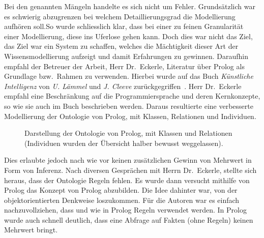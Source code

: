 Bei den genannten Mängeln handelte es sich nicht um Fehler. Grundsätzlich war es schwierig abzugrenzen bei welchem Detaillierungsgrad die Modellierung aufhören soll.So wurde schliesslich klar, dass bei einer zu feinen Granularität einer Modellierung, diese ins Uferlose gehen kann. Doch dies war nicht das Ziel, das Ziel war ein System zu schaffen, welches die Mächtigkeit dieser Art der Wissensmodellierung aufzeigt und damit Erfahrungen zu gewinnen. Daraufhin empfahl der Betreuer der Arbeit, Herr Dr.\ Eckerle, Literatur über Prolog als Grundlage bzw.\ Rahmen zu verwenden. Hierbei wurde auf das Buch \textit{Künstliche Intelligenz} von \textit{U. Lämmel} und \textit{J. Cleeve} zurückgegriffen~\cite{laemmel}. Herr Dr.\ Eckerle empfahl eine Beschränkung auf die Programmiersprache und deren Kernkonzepte, so wie sie auch im Buch beschrieben werden. Daraus resultierte eine verbesserte Modellierung der Ontologie von Prolog, mit Klassen, Relationen und Individuen.

\begin{figure}[H]
\centering {}
\caption{Darstellung der Ontologie von Prolog, mit Klassen und Relationen (Individuen wurden der Übersicht halber bewusst weggelassen).\label{fig:prolog_baum}\protect\footnotemark}
\end{figure}

Dies erlaubte jedoch nach wie vor keinen zusätzlichen Gewinn von Mehrwert in Form von Inferenz. Nach diversen Gesprächen mit Herrn Dr.\ Eckerle, stellte sich heraus, dass der Ontologie Regeln fehlen. Es wurde dann versucht mithilfe von Prolog das Konzept von Prolog abzubilden. Die Idee dahinter war, von der objektorientierten Denkweise loszukommen. Für die Autoren war es einfach nachzuvollziehen, dass und wie in Prolog Regeln verwendet werden. In Prolog wurde auch schnell deutlich, dass eine Abfrage auf Fakten (ohne Regeln) keinen Mehrwert bringt.

